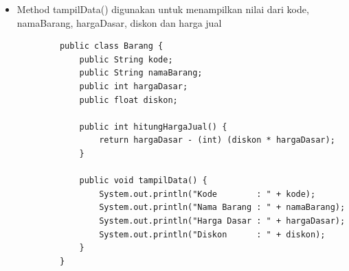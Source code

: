 \documentclass[12pt,titlepage]{article}
\begin{document}
\begin{enumerate}
{\begin{itemize}
{                $$harga jual = harga dasar - (diskon \times harga dasar)$$
            }
            \item {
                Method tampilData() digunakan untuk menampilkan nilai dari kode, namaBarang,
                hargaDasar, diskon dan harga jual
            }
        \end{itemize}

        \begin{verbatim}
            public class Barang {
                public String kode;
                public String namaBarang;
                public int hargaDasar;
                public float diskon;

                public int hitungHargaJual() {
                    return hargaDasar - (int) (diskon * hargaDasar);
                }

                public void tampilData() {
                    System.out.println("Kode        : " + kode);
                    System.out.println("Nama Barang : " + namaBarang);
                    System.out.println("Harga Dasar : " + hargaDasar);
                    System.out.println("Diskon      : " + diskon);
                }
            }
        \end{verbatim}
    }
\end{enumerate}
\end{document}
